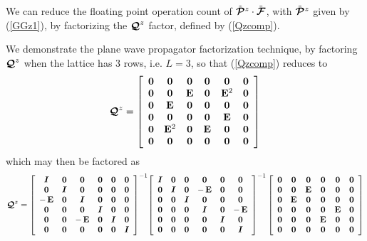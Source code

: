 We can reduce the floating point operation count of $\tilde{\mbox{\boldmath$\cal P$\unboldmath}}{}^{z}\cdot \tilde{\mbox{\boldmath$\cal F$\unboldmath}}$, with $\tilde{\mbox{\boldmath$\cal P$\unboldmath}}{}^{z}$ given by (\ref{GGz1}), by factorizing  the ${\mbox{\boldmath$\cal Q$\unboldmath}}^{z}$ factor, 
defined by (\ref{Qzcomp}).

We demonstrate the plane wave propagator factorization technique, by 
factoring ${\mbox{\boldmath$\cal Q$\unboldmath}}^{z}$ when the lattice has $3$ rows, i.e. $L=3$, so that (\ref{Qzcomp}) reduces to
\begin{equation} \label{Qz3}
{\mbox{\boldmath$\cal Q$\unboldmath}}^{z}=
\left[{\begin{array}{cccccc} 
{\bf 0}&{\bf 0}&{\bf 0}&{\bf 0}&{\bf 0}&{\bf 0}\\
{\bf 0}&{\bf 0}& {\bf E}& {\bf 0}&{\bf E}^{2}&{\bf 0}\\
{\bf 0}& {\bf E}& {\bf 0}&{\bf 0}&{\bf 0}&{\bf 0}\\
{\bf 0}&{\bf 0}&{\bf 0}&{\bf 0}& {\bf E}& {\bf 0}\\
{\bf 0}&{\bf E}^{2}&{\bf 0}& {\bf E}& {\bf 0}&{\bf 0}\\
{\bf 0}&{\bf 0}&{\bf 0}&{\bf 0}&{\bf 0}&{\bf 0}\end{array}}\right]
\end{equation}
which may then be factored as
\begin{equation} \label{Qz3fac}
{\mbox{\boldmath$\cal Q$\unboldmath}}^{z}={\left[{\begin{array}{cccccc} 
{\mbox{\boldmath$\mit I$\unboldmath}}&{\bf 0}&{\bf 0}&{\bf 0}&{\bf 0}&{\bf 0}\\
{\bf 0}&{\mbox{\boldmath$\mit I$\unboldmath}}&{\bf 0}&{\bf 0}&{\bf 0}&{\bf 0}\\
-\, {\bf E}& {\bf 0}&{\mbox{\boldmath$\mit I$\unboldmath}}&{\bf 0}&{\bf 0}&{\bf 0}\\
{\bf 0}&{\bf 0}&{\bf 0}&{\mbox{\boldmath$\mit I$\unboldmath}}&{\bf 0}&{\bf 0}\\
{\bf 0}&{\bf 0}&-\, {\bf E}& {\bf 0}&{\mbox{\boldmath$\mit I$\unboldmath}}&{\bf 0}\\
{\bf 0}&{\bf 0}&{\bf 0}&{\bf 0}&{\bf 0}&{\mbox{\boldmath$\mit I$\unboldmath}}\end{array}}\right]}^{-1}
{\left[{\begin{array}{cccccc} {\mbox{\boldmath$\mit I$\unboldmath}}&{\bf 0}&{\bf 0}&{\bf 0}&{\bf 0}&{\bf 0}\\
{\bf 0}&{\mbox{\boldmath$\mit I$\unboldmath}}&{\bf 0}&-\, {\bf E}& {\bf 0}&{\bf 0}\\
{\bf 0}&{\bf 0}&{\mbox{\boldmath$\mit I$\unboldmath}}&{\bf 0}&{\bf 0}&{\bf 0}\\
{\bf 0}&{\bf 0}&{\bf 0}&{\mbox{\boldmath$\mit I$\unboldmath}}&{\bf 0}&-\, {\bf E}\\
 {\bf 0}&{\bf 0}&{\bf 0}&{\bf 0}&{\mbox{\boldmath$\mit I$\unboldmath}}&{\bf 0}\\
{\bf 0}&{\bf 0}&{\bf 0}&{\bf 0}&{\bf 0}&{\mbox{\boldmath$\mit I$\unboldmath}}\end{array}}\right]}^{-1}
\left[{\begin{array}{cccccc} {\bf 0}&{\bf 0}&{\bf 0}&{\bf 0}&{\bf 0}&{\bf 0}\\
{\bf 0}&{\bf 0}& {\bf E}& {\bf 0}&{\bf 0}&{\bf 0}\\
{\bf 0}& {\bf E}& {\bf 0}&{\bf 0}&{\bf 0}&{\bf 0}\\
{\bf 0}&{\bf 0}&{\bf 0}&{\bf 0}& {\bf E}& {\bf 0}\\
{\bf 0}&{\bf 0}&{\bf 0}& {\bf E}& {\bf 0}&{\bf 0}\\
{\bf 0}&{\bf 0}&{\bf 0}&{\bf 0}&{\bf 0}&{\bf 0}\end{array}}\right]
\end{equation}

